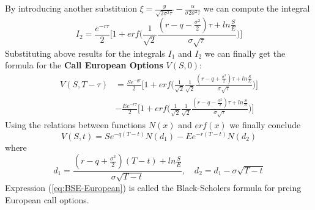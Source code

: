 \documentclass[a4paper]{article}
\begin{document}
\begin{itemize}
By introducing another substituion $\xi = \frac{y}{\sqrt{2\sigma^2 \tau}} - \frac{\alpha}{\sigma{2\sigma^2 \tau}}$ we can compute the integral
\begin{equation}
    I_2 = \frac{e^{-r \tau}}{2} \bigg[ 1 + erf \bigg( \frac{1}{\sqrt{2}} \frac{(r-q-\frac{\sigma^2}{2})\tau + ln\frac{S}{E}}{\sigma \sqrt{\tau}}\bigg) \bigg]
\end{equation}
Substituting above results for the integrals $I_1$ and $I_2$ we can finally get the formula for the \textbf{Call European Options} $V(S, 0)$:
\begin{align}
    V(S, T-\tau) &= \frac{Se^{-q\tau}}{2} \bigg[ 1 + erf \bigg( \frac{1}{\sqrt{2}} \frac{1}{\sqrt{2}} \frac{(r - q + \frac{\sigma^2}{2}) \tau + ln \frac{S}{E}}{\sigma \sqrt{\tau}} \bigg) \bigg]\\
                &- \frac{E e^{-r \tau}}{2} \bigg[ 1 + erf \bigg( \frac{1}{\sqrt{2}} \frac{1}{\sqrt{2}} \frac{(r - q - \frac{\sigma^2}{2}) \tau + ln \frac{S}{E}}{\sigma \sqrt{\tau}} \bigg) \bigg]
\end{align}
Using the relations between functions $N(x)$ and $erf(x)$ we finally conclude
\begin{equation}
    V(S,t) = S e^{-q(T-t)} N(d_1) - E e^{-r(T-t)} N(d_2)
    \label{eq:BSE-European}
\end{equation}
where
\begin{equation}
    d_1 = \frac{(r - q + \frac{\sigma^2}{2}) (T - t) + ln \frac{S}{E}}{\sigma \sqrt{T-t}}, \quad d_2 = d_1 - \sigma\sqrt{T-t}
\end{equation}
Expression (\ref{eq:BSE-European}) is called the Black-Scholers formula for prcing European call options.
\end{itemize}
\end{document}
